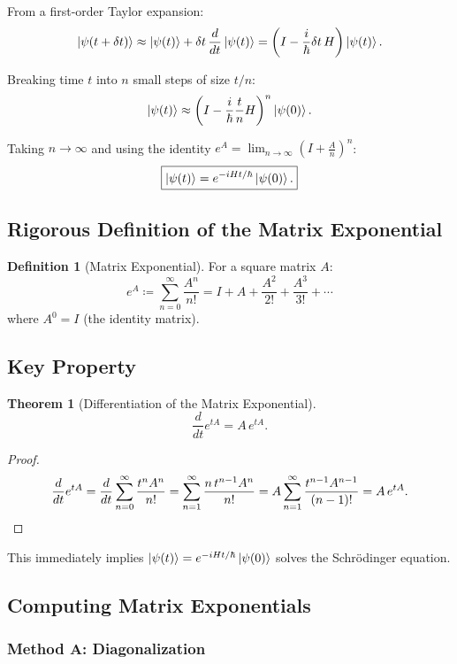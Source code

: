 \documentclass[11pt,a4paper]{article}
\theoremstyle{definition}
\newtheorem{definition}{Definition}[section]
\theoremstyle{plain}
\newtheorem{theorem}{Theorem}[section]
\theoremstyle{remark}
\begin{document}
From a first-order Taylor expansion:
\[
    \ket{\psi(t + \delta t)} \approx \ket{\psi(t)} + \delta t\,\frac{d}{dt}\ket{\psi(t)} = \left(I - \frac{i}{\hbar}\delta t\, H\right)\ket{\psi(t)}.
\]

Breaking time $t$ into $n$ small steps of size $t/n$:
\[
    \ket{\psi(t)} \approx \left(I - \frac{i}{\hbar}\frac{t}{n}H\right)^n \ket{\psi(0)}.
\]

Taking $n \to \infty$ and using the identity $e^A = \lim_{n\to\infty}\left(I + \frac{A}{n}\right)^n$:
\[
    \boxed{\ket{\psi(t)} = e^{-iHt/\hbar}\ket{\psi(0)}.}
\]

\subsection{Rigorous Definition of the Matrix Exponential}

\begin{definition}[Matrix Exponential]
    For a square matrix $A$:
    \[
        e^A \coloneqq \sum_{n=0}^{\infty} \frac{A^n}{n!} = I + A + \frac{A^2}{2!} + \frac{A^3}{3!} + \cdots
    \]
    where $A^0 = I$ (the identity matrix).
\end{definition}

\subsection{Key Property}

\begin{theorem}[Differentiation of the Matrix Exponential]
    \[
        \frac{d}{dt}e^{tA} = A\,e^{tA}.
    \]
\end{theorem}

\begin{proof}
    \[
        \frac{d}{dt}e^{tA} = \frac{d}{dt}\sum_{n=0}^{\infty}\frac{t^n A^n}{n!} = \sum_{n=1}^{\infty}\frac{n\,t^{n-1}A^n}{n!} = A\sum_{n=1}^{\infty}\frac{t^{n-1}A^{n-1}}{(n-1)!} = A\,e^{tA}. \qedhere
    \]
\end{proof}

This immediately implies $\ket{\psi(t)} = e^{-iHt/\hbar}\ket{\psi(0)}$ solves the Schr\"odinger equation.

\subsection{Computing Matrix Exponentials}

\subsubsection{Method A: Diagonalization}
\end{document}
